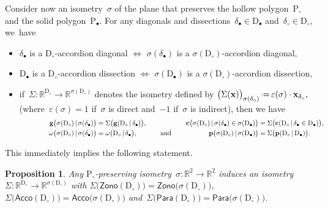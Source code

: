 \documentclass{amsart}
\newtheorem{proposition}[theorem]{Proposition}
\theoremstyle{definition}
\newcommand{\R}{\mathbb{R}} %
\renewcommand{\b}[1]{\mathbf{#1}} %
\newcommand{\eqdef}{\mbox{\,\raisebox{0.2ex}{\scriptsize\ensuremath{\mathrm:}}\ensuremath{=}\,}} %
\newcommand{\Acco}{\mathsf{Acco}} %
\newcommand{\Para}{\mathsf{Para}} %
\newcommand{\Zono}{\mathsf{Zono}} %
\newcommand{\polygon}{\mathrm{P}} %
\newcommand{\dissection}{\mathrm{D}} %
\newcommand{\signature}{\varepsilon} %
\newcommand{\gvector}[2]{\mathbf{g}(#1 \,|\, #2)} %
\newcommand{\biggvector}[2]{\mathbf{g} \big( #1 \,|\, #2 \big)} %
\newcommand{\cvector}[3]{\mathbf{c}(#1  \,|\, #3 \in #2)} %
\newcommand{\bigcvector}[3]{\mathbf{c} \big( #1  \,|\, #3 \in #2 \big)} %
\newcommand{\bigrhs}[2]{\omega \big( #1  \,|\, #2 \big)} %
\newcommand{\point}[2]{\mathbf{p}(#1  \,|\, #2)} %
\newcommand{\bigpoint}[2]{\mathbf{p} \big( #1  \,|\, #2 \big)} %
\begin{document}
Consider now an isometry~$\sigma$ of the plane that preserves the hollow polygon~$\polygon_\circ$ and the solid polygon~$\polygon_\bullet$. For any diagonals and dissections~$\delta_\bullet \in \dissection_\bullet$ and~$\delta_\circ \in \dissection_\circ$, we~have
\begin{itemize}
\item $\delta_\bullet$ is a $\dissection_\circ$-accordion diagonal $\iff$ $\sigma(\delta_\bullet)$ is a $\sigma(\dissection_\circ)$-accordion diagonal,
\item $\dissection_\bullet$ is a $\dissection_\circ$-accordion dissection $\iff$ $\sigma(\dissection_\bullet)$ is a $\sigma(\dissection_\circ)$-accordion dissection,
\item if~$\Sigma : \R^{\dissection_\circ} \to \R^{\sigma(\dissection_\circ)}$ denotes the isometry defined by
\(
\big( \Sigma(\b{x}) \big)_{\sigma(\delta_\circ)} \eqdef \signature(\sigma) \cdot \b{x}_{\delta_\circ},
\)
(where~${\signature(\sigma) = 1}$ if~$\sigma$ is direct and~$-1$ if~$\sigma$ is indirect), then we have
\[
\begin{array}{@{\hspace{1.5cm}}r@{\;=\;}lcr@{\;=\;}l}
\biggvector{\sigma(\dissection_\circ)}{\sigma(\delta_\bullet)} & \Sigma\big(\gvector{\dissection_\circ}{\delta_\bullet}\big),
& \qquad\qquad &
\bigcvector{\sigma(\dissection_\circ)}{\sigma(\dissection_\bullet)}{\sigma(\delta_\bullet)} & \Sigma\big(\cvector{\dissection_\circ}{\dissection_\bullet}{\delta_\bullet}\big), \\[.1cm]
\bigrhs{\sigma(\dissection_\circ)}{\sigma(\delta_\bullet)} & \bigrhs{\dissection_\circ}{\delta_\bullet},
& \text{and} &
\bigpoint{\sigma(\dissection_\circ)}{\sigma(\dissection_\bullet)} & \Sigma\big(\point{\dissection_\circ}{\dissection_\bullet}\big).
\end{array}
\]
\end{itemize}
This immediately implies the following statement.

\begin{proposition}
Any $\polygon_\circ$-preserving isometry~$\sigma : \R^2 \to \R^2$ induces an isometry~$\Sigma : \R^{\dissection_\circ} \to \R^{\sigma(\dissection_\circ)}$
with $\Sigma\big(\Zono(\dissection_\circ)\big) \! = \Zono\big(\sigma(\dissection_\circ)\big)$, $\Sigma\big(\Acco(\dissection_\circ)\big) \! = \Acco\big(\sigma(\dissection_\circ)\big)$ and~$\Sigma\big(\Para(\dissection_\circ)\big) \! = \Para\big(\sigma(\dissection_\circ)\big)$.
\end{proposition}
\end{document}
